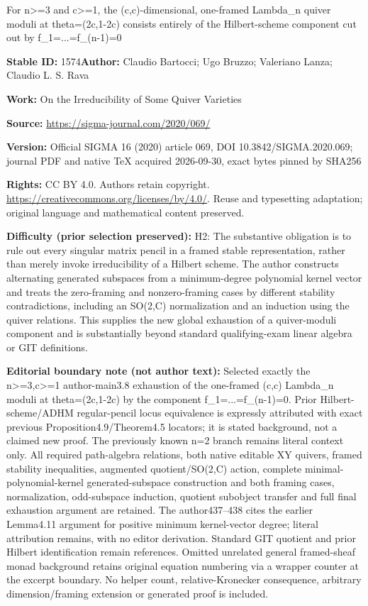 \documentclass[11pt]{article}
\numberwithin{equation}{section}
\numberwithin{equation}{section}
\begin{document}
\begin{center}\Large For n>=3 and c>=1, the (c,c)-dimensional, one-framed Lambda\_n quiver moduli at theta=(2c,1-2c) consists entirely of the Hilbert-scheme component cut out by f\_1=...=f\_(n-1)=0\end{center}
\noindent\textbf{Stable ID:} 1574\quad\textbf{Author:} Claudio Bartocci; Ugo Bruzzo; Valeriano Lanza; Claudio L. S. Rava\par
\noindent\textbf{Work:} On the Irreducibility of Some Quiver Varieties\par
\noindent\textbf{Source:} \url{https://sigma-journal.com/2020/069/}\par
\noindent\textbf{Version:} Official SIGMA 16 (2020) article 069, DOI 10.3842/SIGMA.2020.069; journal PDF and native TeX acquired 2026-09-30, exact bytes pinned by SHA256\par
\noindent\textbf{Rights:} CC BY 4.0. Authors retain copyright. \url{https://creativecommons.org/licenses/by/4.0/}. Reuse and typesetting adaptation; original language and mathematical content preserved.\par
\noindent\textbf{Difficulty (prior selection preserved):} {\CJKfont H2: The substantive obligation is to rule out every singular matrix pencil in a framed stable representation, rather than merely invoke irreducibility of a Hilbert scheme. The author constructs alternating generated subspaces from a minimum-degree polynomial kernel vector and treats the zero-framing and nonzero-framing cases by different stability contradictions, including an SO(2,C) normalization and an induction using the quiver relations. This supplies the new global exhaustion of a quiver-moduli component and is substantially beyond standard qualifying-exam linear algebra or GIT definitions.}\par
\medskip\noindent\textbf{Editorial boundary note (not author text):} Selected exactly the n>=3,c>=1 author-main3.8 exhaustion of the one-framed (c,c) Lambda\_n moduli at theta=(2c,1-2c) by the component f\_1=...=f\_(n-1)=0. Prior Hilbert-scheme/ADHM regular-pencil locus equivalence is expressly attributed with exact previous Proposition4.9/Theorem4.5 locators; it is stated background, not a claimed new proof. The previously known n=2 branch remains literal context only. All required path-algebra relations, both native editable XY quivers, framed stability inequalities, augmented quotient/SO(2,C) action, complete minimal-polynomial-kernel generated-subspace construction and both framing cases, normalization, odd-subspace induction, quotient subobject transfer and full final exhaustion argument are retained. The author437–438 cites the earlier Lemma4.11 argument for positive minimum kernel-vector degree; literal attribution remains, with no editor derivation. Standard GIT quotient and prior Hilbert identification remain references. Omitted unrelated general framed-sheaf monad background retains original equation numbering via a wrapper counter at the excerpt boundary. No helper count, relative-Kronecker consequence, arbitrary dimension/framing extension or generated proof is included.\par
\end{document}
